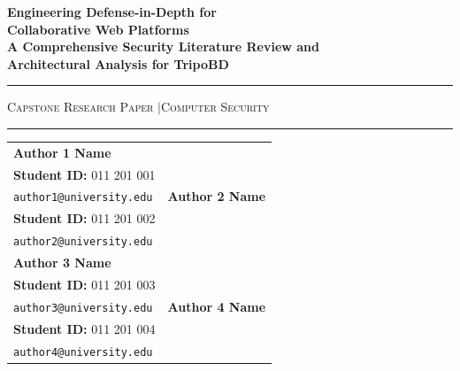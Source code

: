 \documentclass[10pt,twocolumn,a4paper]{article}
\begin{document}
\begin{titlepage}
    \centering
    \vspace*{1.5cm}

    {\Huge \textbf{Engineering Defense-in-Depth for\\[0.35cm] Collaborative Web Platforms}}\\[0.6cm]
    {\LARGE \textbf{A Comprehensive Security Literature Review and}\\[0.25cm]
    \textbf{Architectural Analysis for TripoBD}}\par

    \vspace{0.8cm}
    \noindent\rule{0.85\textwidth}{1.2pt}\par
    \vspace{0.4cm}
    {\large \textsc{Capstone Research Paper \quad$\vert$\quad Computer Security}}\par
    \vspace{0.4cm}
    \noindent\rule{0.85\textwidth}{1.2pt}\par

    \vspace{2.8cm}
    \begin{center}
    \begin{tabular}{p{} p{}}
        \centering
        {\large \textbf{Author 1 Name}}\\[0.15cm]
        \textbf{Student ID:} 011 201 001\\[0.1cm]
        \texttt{author1@university.edu}
        &
        \centering
        {\large \textbf{Author 2 Name}}\\[0.15cm]
        \textbf{Student ID:} 011 201 002\\[0.1cm]
        \texttt{author2@university.edu}
        \\[2.2cm]
        \centering
        {\large \textbf{Author 3 Name}}\\[0.15cm]
        \textbf{Student ID:} 011 201 003\\[0.1cm]
        \texttt{author3@university.edu}
        &
        \centering
        {\large \textbf{Author 4 Name}}\\[0.15cm]
        \textbf{Student ID:} 011 201 004\\[0.1cm]
        \texttt{author4@university.edu}
    \end{tabular}
    \end{center}


\end{titlepage}
\end{document}
